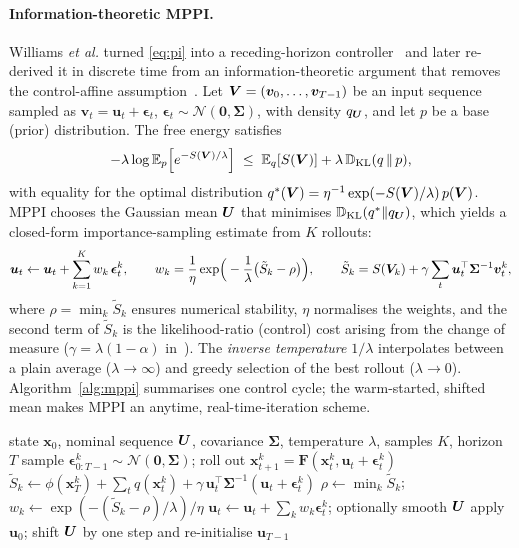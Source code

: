 \paragraph{Information-theoretic MPPI.}
Williams \emph{et al.} turned \eqref{eq:pi} into a receding-horizon controller~\cite{williams2016aggressive,williams2017jgcd} and later re-derived it in discrete time from an information-theoretic argument that removes the control-affine assumption~\cite{williams2017itmpc,williams2018tro}. Let $\bm{V}=(\bm{v}_0,\dots,\bm{v}_{T-1})$ be an input sequence sampled as $\bm{v}_t=\bm{u}_t+\bm{\epsilon}_t$, $\bm{\epsilon}_t\sim\mathcal{N}(\bm 0,\bm\Sigma)$, with density $q_{\bm{U}}$, and let $p$ be a base (prior) distribution. The free energy satisfies
\begin{equation}
-\lambda\log\mathbb{E}_{p}\!\left[e^{-S(\bm{V})/\lambda}\right]\;\le\;\mathbb{E}_{q}[S(\bm{V})]+\lambda\,\mathbb{D}_{\mathrm{KL}}(q\,\|\,p),
\end{equation}
with equality for the optimal distribution $q^*(\bm{V})=\eta^{-1}\exp(-S(\bm{V})/\lambda)\,p(\bm{V})$. MPPI chooses the Gaussian mean $\bm{U}$ that minimises $\mathbb{D}_{\mathrm{KL}}(q^*\|q_{\bm{U}})$, which yields a closed-form importance-sampling estimate from $K$ rollouts:
\begin{equation}
\bm{u}_t\leftarrow\bm{u}_t+\sum_{k=1}^{K}w_k\,\bm{\epsilon}^k_t,\qquad
w_k=\frac{1}{\eta}\exp\!\Big(-\frac{1}{\lambda}\big(\tilde S_k-\rho\big)\Big),\qquad
\tilde S_k=S(\bm{V}_k)+\gamma\sum_{t}\bm{u}_t^\top\bm\Sigma^{-1}\bm{v}^k_t,
\label{eq:mppi}
\end{equation}
where $\rho=\min_k\tilde S_k$ ensures numerical stability, $\eta$ normalises the weights, and the second term of $\tilde S_k$ is the likelihood-ratio (control) cost arising from the change of measure ($\gamma=\lambda(1-\alpha)$ in~\cite{williams2018tro}). The \emph{inverse temperature} $1/\lambda$ interpolates between a plain average ($\lambda\to\infty$) and greedy selection of the best rollout ($\lambda\to0$). Algorithm~\ref{alg:mppi} summarises one control cycle; the warm-started, shifted mean makes MPPI an anytime, real-time-iteration scheme.

\begin{algorithm}[t]
\caption{One cycle of MPPI (receding horizon)}\label{alg:mppi}
\begin{algorithmic}[1]
\small
\Require state $\bm{x}_0$, nominal sequence $\bm{U}$, covariance $\bm\Sigma$, temperature $\lambda$, samples $K$, horizon $T$
  \State sample $\bm{\epsilon}^k_{0:T-1}\sim\mathcal{N}(\bm 0,\bm\Sigma)$; \quad roll out $\bm{x}^k_{t+1}=\bm{F}(\bm{x}^k_t,\bm{u}_t+\bm{\epsilon}^k_t)$ 
  \State $\tilde S_k\gets \phi(\bm{x}^k_T)+\sum_t q(\bm{x}^k_t)+\gamma\,\bm{u}_t^\top\bm\Sigma^{-1}(\bm{u}_t+\bm{\epsilon}^k_t)$
\EndFor
\State $\rho\gets\min_k\tilde S_k$;\quad $w_k\gets\exp(-(\tilde S_k-\rho)/\lambda)/\eta$ 
\State $\bm{u}_t\gets\bm{u}_t+\sum_k w_k\bm{\epsilon}^k_t$; optionally smooth $\bm{U}$ 
\State apply $\bm{u}_0$; shift $\bm{U}$ by one step and re-initialise $\bm{u}_{T-1}$ 
\end{algorithmic}
\end{algorithm}

